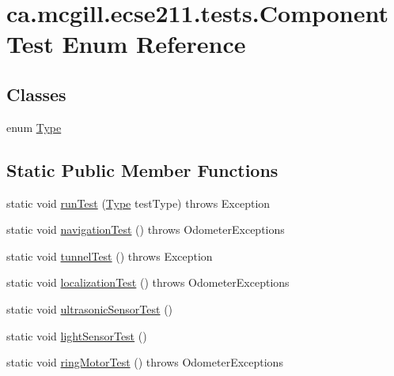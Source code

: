 \hypertarget{enumca_1_1mcgill_1_1ecse211_1_1tests_1_1_component_test}{}\section{ca.\+mcgill.\+ecse211.\+tests.\+Component\+Test Enum Reference}
\label{enumca_1_1mcgill_1_1ecse211_1_1tests_1_1_component_test}
\subsection*{Classes}
\begin{DoxyCompactItemize}
\item 
enum \hyperlink{enumca_1_1mcgill_1_1ecse211_1_1tests_1_1_component_test_1_1_type}{Type}
\end{DoxyCompactItemize}
\subsection*{Static Public Member Functions}
\begin{DoxyCompactItemize}
\item 
static void \hyperlink{enumca_1_1mcgill_1_1ecse211_1_1tests_1_1_component_test_a5dc8bf97bc48adf5bee88d425a1a974e}{run\+Test} (\hyperlink{enumca_1_1mcgill_1_1ecse211_1_1tests_1_1_component_test_1_1_type}{Type} test\+Type)  throws Exception 
\item 
static void \hyperlink{enumca_1_1mcgill_1_1ecse211_1_1tests_1_1_component_test_aa40592bb550b3526402faddbc0d890c7}{navigation\+Test} ()  throws Odometer\+Exceptions 
\item 
static void \hyperlink{enumca_1_1mcgill_1_1ecse211_1_1tests_1_1_component_test_ae85caa20c6391bacc4fdbd411ee3f113}{tunnel\+Test} ()  throws Exception 
\item 
static void \hyperlink{enumca_1_1mcgill_1_1ecse211_1_1tests_1_1_component_test_ad11712dd74c5c64e84cd71186a59a087}{localization\+Test} ()  throws Odometer\+Exceptions 
\item 
static void \hyperlink{enumca_1_1mcgill_1_1ecse211_1_1tests_1_1_component_test_a05cd9d95458b11ed57ca001a28fffa7c}{ultrasonic\+Sensor\+Test} ()
\item 
static void \hyperlink{enumca_1_1mcgill_1_1ecse211_1_1tests_1_1_component_test_a3e8288f482b3806a0f3c4668951f3e36}{light\+Sensor\+Test} ()
\item 
static void \hyperlink{enumca_1_1mcgill_1_1ecse211_1_1tests_1_1_component_test_a1ecca45b47067d825683cf46dcf22b62}{ring\+Motor\+Test} ()  throws Odometer\+Exceptions 
\end{DoxyCompactItemize}


